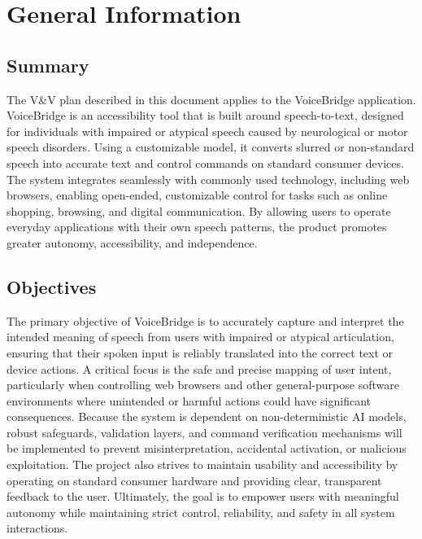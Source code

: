 \documentclass[12pt, titlepage]{article}
\begin{document}
\newpage



\section{General Information}

\subsection{Summary}

The V\&V plan described in this document applies to the VoiceBridge application. VoiceBridge is an accessibility tool that is built around speech-to-text, designed for individuals with impaired or atypical speech caused by neurological or motor speech disorders. Using a customizable model, it converts slurred or non-standard speech into accurate text and control commands on standard consumer devices. The system integrates seamlessly with commonly used technology, including web browsers, enabling open-ended, customizable control for tasks such as online shopping, browsing, and digital communication. By allowing users to operate everyday applications with their own speech patterns, the product promotes greater autonomy, accessibility, and independence.

\subsection{Objectives}

The primary objective of VoiceBridge is to accurately capture and interpret the intended meaning of speech from users with impaired or atypical articulation, ensuring that their spoken input is reliably translated into the correct text or device actions. A critical focus is the safe and precise mapping of user intent, particularly when controlling web browsers and other general-purpose software environments where unintended or harmful actions could have significant consequences. Because the system is dependent on non-deterministic AI models, robust safeguards, validation layers, and command verification mechanisms will be implemented to prevent misinterpretation, accidental activation, or malicious exploitation. The project also strives to maintain usability and accessibility by operating on standard consumer hardware and providing clear, transparent feedback to the user. Ultimately, the goal is to empower users with meaningful autonomy while maintaining strict control, reliability, and safety in all system interactions.
\end{document}
